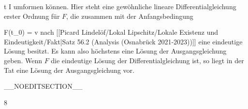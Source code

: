 {\mavergleichskette
{\vergleichskette
{ t
}
{ \in }{ I
}
{  }{
}
{    }{
}
{   }{
}
}
{}{}{}
umformen können. Hier steht eine gewöhnliche lineare Differentialgleichung erster Ordnung für $F$, die zusammen mit der Anfangsbedingung

\mavergleichskette
{\vergleichskette
{ F(t_0)
}
{ = }{ v
}
{  }{
}
{    }{
}
{   }{
}
}
{}{}{}
nach
[[Picard Lindelöf/Lokal Lipschitz/Lokale Existenz und Eindeutigkeit/Fakt|Satz 56.2 (Analysis (Osnabrück 2021-2023))]]
eine eindeutige Lösung besitzt. Es kann also höchstens eine Lösung der Ausgangsgleichung geben. Wenn $F$ die eindeutige Lösung der Differentialgleichung ist, so liegt in der Tat eine Lösung der Ausgangsgleichung vor.

 }

__NOEDITSECTION__

{8}

